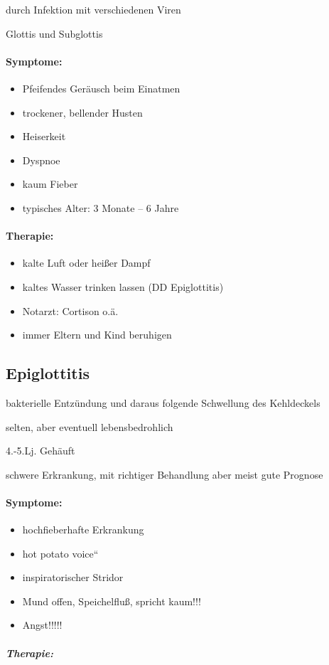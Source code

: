 durch Infektion mit verschiedenen Viren

{\mdseries
Glottis und Subglottis}

\paragraph{Symptome:}

\begin{itemize}
    \item Pfeifendes Geräusch beim Einatmen
    \gZ{[inspiratorischer Stridor)}
    \item trockener, bellender Husten
    \item Heiserkeit
    \item Dyspnoe
    \item kaum Fieber
    \item typisches Alter: 3 Monate -- 6 Jahre
\end{itemize}

\paragraph{Therapie:}

\begin{itemize}
    \item kalte  Luft oder hei{\ss}er  Dampf
    \item kaltes Wasser trinken lassen (DD Epiglottitis)
    \item Notarzt: Cortison o.ä.
    \item immer Eltern und  Kind beruhigen
\end{itemize}



\subsection{Epiglottitis}

bakterielle Entz\"undung und daraus  folgende Schwellung des
Kehldeckels

selten, aber eventuell lebensbedrohlich

4.-5.Lj. Gehäuft

schwere Erkrankung, mit richtiger  Behandlung aber meist gute Prognose

\paragraph{Symptome:}

\begin{itemize}
\item {\mdseries
hochfieberhafte Erkrankung}

\item {\mdseries
{\quotedblbase}hot potato voice{\textquotedblleft}}

\item {\mdseries
inspiratorischer Stridor}

\item {\mdseries
Mund offen, Speichelflu{\ss}, spricht kaum!!!}

\item {\mdseries
Angst!!!!!}

\end{itemize}
\subparagraph*{
Therapie:}


